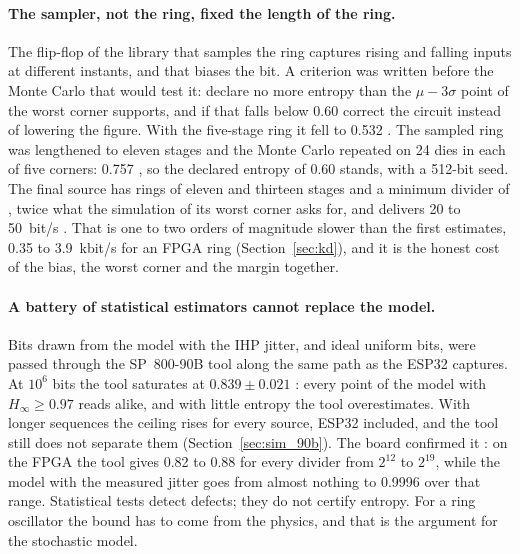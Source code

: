 \paragraph{The sampler, not the ring, fixed the length of the ring.} The
flip-flop of the library that samples the ring captures rising and
falling inputs at different instants, and that biases the bit. A
criterion was written before the Monte Carlo that would test it: declare
no more entropy than the $\mu - 3\sigma$ point of the worst corner
supports, and if that falls below 0.60 correct the circuit instead of
lowering the figure. With the five-stage ring it fell to 0.532 \simu{}.
The sampled ring was lengthened to eleven stages and the Monte Carlo
repeated on 24 dies in each of five corners: 0.757 \simu{}, so the
declared entropy of 0.60 stands, with a 512-bit seed. The final source
has rings of eleven and thirteen stages and a minimum divider of ,
twice what the simulation of its worst corner asks for, and delivers 20
to 50~bit/s \est{}. That is one to two orders of magnitude slower than
the first estimates, 0.35 to 3.9~kbit/s for an \ac{FPGA} ring \est{}
(Section~\ref{sec:kd}), and it is the honest cost of the bias, the worst
corner and the margin together.

\paragraph{A battery of statistical estimators cannot replace the model.}
Bits drawn from the model with the IHP jitter, and ideal uniform bits,
were passed through the SP~800-90B tool along the same path as the ESP32
captures. At $10^6$ bits the tool saturates at $0.839 \pm 0.021$
\simu{}: every point of the model with $H_\infty \ge 0.97$ reads alike,
and with little entropy the tool overestimates. With longer sequences the
ceiling rises for every source, ESP32 included, and the tool still does
not separate them (Section~\ref{sec:sim_90b}). The board confirmed it
\meas{}: on the \ac{FPGA} the tool gives 0.82 to 0.88 for every divider
from $2^{12}$ to $2^{19}$, while the model with the measured jitter goes
from almost nothing to 0.9996 over that range. Statistical tests detect
defects; they do not certify entropy. For a ring oscillator the bound has
to come from the physics, and that is the argument for the stochastic
model.

